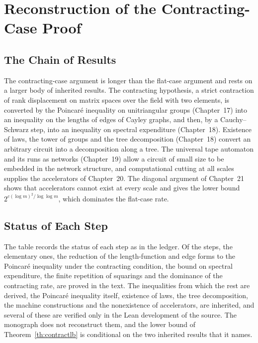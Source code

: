 \documentclass[11pt,letterpaper]{report}
\theoremstyle{plain}
\theoremstyle{definition}
\theoremstyle{remark}
\begin{document}
\chapter{Reconstruction of the Contracting-Case Proof}

\section{The Chain of Results}

The contracting-case argument is longer than the flat-case argument and rests on a larger body of inherited results. The contracting hypothesis, a strict contraction of rank displacement on matrix spaces over the field with two elements, is converted by the Poincar\'e inequality on unitriangular groups (Chapter~17) into an inequality on the lengths of edges of Cayley graphs, and then, by a Cauchy--Schwarz step, into an inequality on spectral expenditure (Chapter~18). Existence of laws, the tower of groups and the tree decomposition (Chapter~18) convert an arbitrary circuit into a decomposition along a tree. The universal tape automaton and its runs as networks (Chapter~19) allow a circuit of small size to be embedded in the network structure, and computational cutting at all scales supplies the accelerators of Chapter~20. The diagonal argument of Chapter~21 shows that accelerators cannot exist at every scale and gives the lower bound $2^{c(\log m)^2/\log\log m}$, which dominates the flat-case rate.

\section{Status of Each Step}

The table records the status of each step as in the ledger. Of the steps, the elementary ones, the reduction of the length-function and edge forms to the Poincar\'e inequality under the contracting condition, the bound on spectral expenditure, the finite repetition of squarings and the dominance of the contracting rate, are proved in the text. The inequalities from which the rest are derived, the Poincar\'e inequality itself, existence of laws, the tree decomposition, the machine constructions and the nonexistence of accelerators, are inherited, and several of these are verified only in the Lean development of the source. The monograph does not reconstruct them, and the lower bound of Theorem~\ref{th:contractlb} is conditional on the two inherited results that it names.
\end{document}
